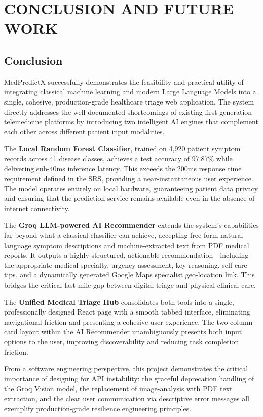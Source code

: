 \chapter{CONCLUSION AND FUTURE WORK}

\section{Conclusion}

MedPredictX successfully demonstrates the feasibility and practical utility of integrating classical machine learning and modern Large Language Models into a single, cohesive, production-grade healthcare triage web application. The system directly addresses the well-documented shortcomings of existing first-generation telemedicine platforms by introducing two intelligent AI engines that complement each other across different patient input modalities.

The \textbf{Local Random Forest Classifier}, trained on 4,920 patient symptom records across 41 disease classes, achieves a test accuracy of 97.87\% while delivering sub-40ms inference latency. This exceeds the 200ms response time requirement defined in the SRS, providing a near-instantaneous user experience. The model operates entirely on local hardware, guaranteeing patient data privacy and ensuring that the prediction service remains available even in the absence of internet connectivity.

The \textbf{Groq LLM-powered AI Recommender} extends the system's capabilities far beyond what a classical classifier can achieve, accepting free-form natural language symptom descriptions and machine-extracted text from PDF medical reports. It outputs a highly structured, actionable recommendation---including the appropriate medical specialty, urgency assessment, key reasoning, self-care tips, and a dynamically generated Google Maps specialist geo-location link. This bridges the critical last-mile gap between digital triage and physical clinical care.

The \textbf{Unified Medical Triage Hub} consolidates both tools into a single, professionally designed React page with a smooth tabbed interface, eliminating navigational friction and presenting a cohesive user experience. The two-column card layout within the AI Recommender unambiguously presents both input options to the user, improving discoverability and reducing task completion friction.

From a software engineering perspective, this project demonstrates the critical importance of designing for API instability: the graceful deprecation handling of the Groq Vision model, the replacement of image-analysis with PDF text extraction, and the clear user communication via descriptive error messages all exemplify production-grade resilience engineering principles.

